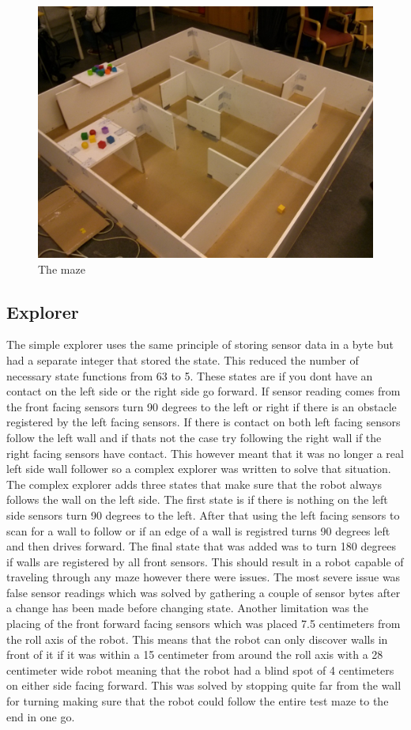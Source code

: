 \begin{figure}
  \centering
  \includegraphics[width=\linewidth]{images/maze.jpg}
  \caption{The maze}
  \label{fig:maze}
\end{figure}
\subsection{Explorer}
The simple explorer uses the same principle of storing sensor data in a byte but
had a separate integer that stored the state. This reduced the  number of
necessary state functions from 63 to 5. These states are if you dont have an
contact on the left side or the right side go forward. If sensor reading comes
from the front facing sensors turn 90 degrees to the left or right if there is
an obstacle registered by the left facing sensors. If there is contact on both
left facing sensors follow the left wall and if thats not the case try following
the right wall if the right facing sensors have contact. This however meant that
it was no longer a real left side wall follower so a complex explorer was
written to solve that situation. The complex explorer adds three states that
make sure that the robot always follows the wall on the left side. The first
state is if there is nothing on the left side sensors turn 90 degrees to the
left. After that using the left facing sensors to scan for a wall to follow or
if an edge of a wall is registred turns 90 degrees left and then drives forward.
The final state that was added was to turn 180 degrees if walls are registered
by all front sensors. This should result in a robot capable of traveling through
any maze however there were issues. The most severe issue was false sensor
readings which was solved by gathering a couple of sensor bytes after a change
has been made before changing state. Another limitation was the placing of the
front forward facing sensors which was placed 7.5 centimeters from the roll axis
of the robot. This means that the robot can only discover walls in front of it
if it was within a 15 centimeter from around the roll axis with a 28 centimeter
wide robot meaning that the robot had a blind spot of 4 centimeters on either
side facing forward. This was solved by stopping quite far from the wall for
turning making sure that the robot could follow the entire test maze to the end
in one go.

